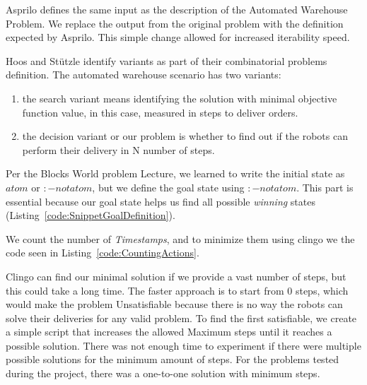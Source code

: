\documentclass{IEEEtran}
\begin{document}
Asprilo defines the same input as the description of the Automated Warehouse Problem\cite{cse579:AutomatedWarehouseScenario}. We replace the output from the original problem with the definition expected by Asprilo. This simple change allowed for increased iterability speed. 



Hoos and Stützle identify variants as part of their combinatorial problems definition\cite{hoos2004stochastic}. The automated warehouse scenario has two variants: 

\begin{enumerate}
\item the search variant means identifying the solution with minimal objective function value, in this case, measured in steps to deliver orders.
\item the decision variant or our problem is whether to find out if the robots can perform their delivery in N number of steps. 
\end{enumerate}

Per the Blocks World problem Lecture\cite{cse579:CourseBlocksWorld}, we learned to write the initial state as $atom$ or $:- not atom$, but we define the goal state using $:- not atom$. This part is essential because our goal state helps us find all possible {\it winning} states (Listing~\ref{code:SnippetGoalDefinition}). 



We count the number of \textit{Timestamps}, and to minimize them using clingo we the code seen in Listing~\ref{code:CountingActions}.



Clingo can find our minimal solution if we provide a vast number of steps, but this could take a long time. The faster approach is to start from 0 steps, which would make the problem Unsatisfiable because there is no way the robots can solve their deliveries for any valid problem. To find the first satisfiable, we create a simple script that increases the allowed Maximum steps until it reaches a possible solution. There was not enough time to experiment if there were multiple possible solutions for the minimum amount of steps. For the problems tested during the project, there was a one-to-one solution with minimum steps.
\end{document}
